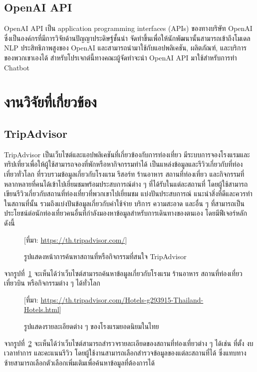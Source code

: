 \documentclass[12pt,oneside,openright,a4paper]{cpe-thai-project}
\begin{document}
\subsection{OpenAI API}
OpenAI API \cite{openai} เป็น application programming interfaces (APIs) ของทางบริษัท OpenAI ซึ่งเป็นองค์กรที่มีการวิจัยด้านปัญญาประดิษฐ์ชั้นนำ จัดทำขึ้นเพื่อให้นักพัฒนานั้นสามารถเข้าถึงโมเดล NLP ประสิทธิภาพสูงของ OpenAI และสามารถนำมาใช้กับแอปพลิเคชัน, ผลิตภัณฑ์, และบริการของพวกเขาเองได้ สำหรับโปรเจกต์นี้ทางคณะผู้จัดทำจะนำ OpenAI API มาใช้สำหรับการทำ Chatbot \newpage

\section{งานวิจัยที่เกี่ยวข้อง}

\subsection{TripAdvisor}
TripAdvisor\cite{tripadvisor} เป็นเว็บไซต์และแอปพลิเคชันที่เกี่ยวข้องกับการท่องเที่ยว มีระบบการจองโรงแรมและ
ทริปเที่ยวเพื่อให้ผู้ใช้สามารถจองที่พักหรือหากิจกรรมทำได้ เป็นแหล่งข้อมูลและรีวิวเกี่ยวกับที่ท่องเที่ยวทั่วโลก
ที่รวบรวมข้อมูลเกี่ยวกับโรงแรม รีสอร์ท ร้านอาหาร สถานที่ท่องเที่ยว และกิจกรรมที่หลากหลายที่คนได้เข้าไปเยี่ยมชมพร้อมประสบการณ์ต่าง ๆ ที่ได้รับในแต่ละสถานที่ โดยผู้ใช้สามารถเขียนรีวิวเกี่ยวกับสถานที่ท่องเที่ยวที่พวกเขาไปเยี่ยมชม แบ่งปันประสบการณ์ แนะนำสิ่งที่ดีและควรทำในสถานที่นั้น รวมถึงแบ่งปันข้อมูลเกี่ยวกับค่าใช้จ่าย บริการ ความสะอาด และอื่น ๆ ที่สามารถเป็นประโยชน์ต่อนักท่องเที่ยวคนอื่นที่กำลังมองหาข้อมูลสำหรับการเดินทางของตนเอง โดยมีฟีเจอร์หลักดังนี้

\begin{figure}[!h]\centering
\setlength{\fboxrule}{0.1mm}
\caption{รูปแสดงหน้าการค้นหาสถานที่หรือกิจกรรมที่สนใจ TripAdvisor}\label{fig:F2.1}
[ที่มา: \href{https://th.tripadvisor.com/} {https://th.tripadvisor.com/}]
\end{figure}
จากรูปที่~\ref{fig:F2.1} จะเห็นได้ว่าเว็บไซต์สามารถค้นหาข้อมูลเกี่ยวกับโรงแรม ร้านอาหาร สถานที่ท่องเที่ยว เที่ยวบิน หรือกิจกรรมต่าง ๆ ได้ทั่วโลก \\

\begin{figure}[!h]\centering
\setlength{\fboxrule}{0.1mm}
\caption{รูปแสดงรายละเอียดต่าง ๆ ของโรงแรมยอดนิยมในไทย}\label{fig:F2.2}
[ที่มา: \href{https://th.tripadvisor.com/Hotels-g293915-Thailand-Hotels.html} {https://th.tripadvisor.com/Hotels-g293915-Thailand-Hotels.html}]
\end{figure}
จากรูปที่~\ref{fig:F2.2} จะเห็นได้ว่าเว็บไซต์สามารถสำรวจรายละเอียดของสถานที่ท่องเที่ยวต่าง ๆ ได้เช่น ที่ตั้ง งบ เวลาทำการ และคะแนนรีวิว โดยผู้ใช้งานสามารถเลือกสำรวจข้อมูลของแต่ละสถานที่ได้ ซึ่งแทบทางซ้ายสามารถเลือกตัวเลือกเพิ่มเติมเพื่อค้นหาข้อมูลที่ต้องการได้ \newpage
\end{document}
